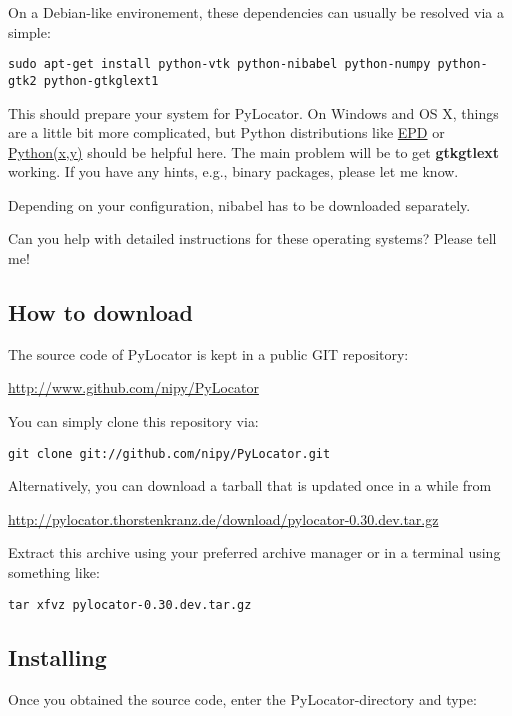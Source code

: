 \documentclass[letterpaper,10pt,english]{sphinxmanual}
\begin{document}
On a Debian-like environement, these dependencies can usually be resolved via a simple:

\begin{Verbatim}[commandchars=@\[\]]
sudo apt-get install python-vtk python-nibabel python-numpy python-gtk2 python-gtkglext1
\end{Verbatim}

This should prepare your system for PyLocator. On Windows and OS X, things are a little bit
more complicated, but Python distributions like \href{http://www.enthought.com/products/epd.php}{EPD}
or \href{http://www.pythonxy.com/}{Python(x,y)} should be helpful here. The main problem will be to
get \textbf{gtkgtlext} working. If you have any hints, e.g., binary packages, please let me know.

Depending on your configuration, nibabel has to be downloaded separately.

Can you help with detailed instructions for these operating systems? Please tell me!


\subsection{How to download}
\label{install:how-to-download}
The source code of PyLocator is kept in a public GIT repository:

\href{http://www.github.com/nipy/PyLocator}{http://www.github.com/nipy/PyLocator}

You can simply clone this repository via:

\begin{Verbatim}[commandchars=@\[\]]
git clone git://github.com/nipy/PyLocator.git
\end{Verbatim}

Alternatively, you can download a tarball that is updated once in a while from

\href{http://pylocator.thorstenkranz.de/download/pylocator-0.30.dev.tar.gz}{http://pylocator.thorstenkranz.de/download/pylocator-0.30.dev.tar.gz}

Extract this archive using your preferred archive manager or in a terminal using something like:

\begin{Verbatim}[commandchars=@\[\]]
tar xfvz pylocator-0.30.dev.tar.gz
\end{Verbatim}


\subsection{Installing}
\label{install:installing}
Once you obtained the source code, enter the PyLocator-directory and type:
\end{document}
